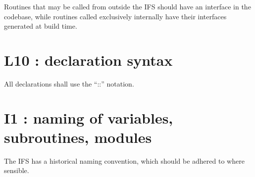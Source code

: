 \documentclass[letterpaper,10pt,english]{sphinxmanual}
\begin{document}
\sphinxAtStartPar
Routines that may be called from outside the IFS should have an interface in the codebase, while
routines called exclusively internally have their interfaces generated at build time.

\sphinxstepscope


\section{L10 : declaration syntax}
\label{\detokenize{rules/L10:l10-declaration-syntax}}\label{\detokenize{rules/L10::doc}}
\sphinxAtStartPar
All declarations shall use the “::” notation.

\sphinxstepscope


\section{I1 : naming of variables, subroutines, modules}
\label{\detokenize{rules/I1:i1-naming-of-variables-subroutines-modules}}\label{\detokenize{rules/I1::doc}}
\sphinxAtStartPar
The IFS has a historical naming convention, which should be adhered to
where sensible.
\end{document}
